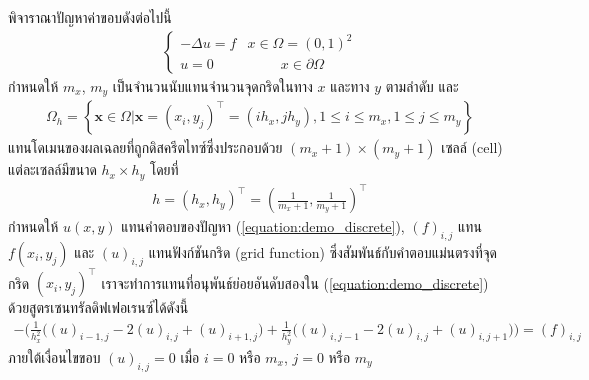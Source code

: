 \begin{Example}
    พิจาราณาปัญหาค่าขอบดังต่อไปนี้
    \begin{align}
        \left \{ \begin{array}{ll}   -\Delta u = f & x \in \Omega =	(0,1)^2	 \\
        u = 0 & \hspace{1cm} x \in \partial \Omega \end{array} \right . 
        \label{equation:demo_discrete}
    \end{align}
    \hspace{1cm} กำหนดให้ $m_x$, $m_y$ เป็นจำนวนนับแทนจำนวนจุดกริดในทาง $x$ และทาง $y$ ตามลำดับ และ
    \begin{align*}
        \Omega_{h}=\left\{ \mathbf{x} \in \Omega | \mathbf{x}=(x_i,y_j)^{\top} = (ih_x,jh_y), 1 \leq i \leq m_x, 1 \leq j \leq m_y  \right\}
    \end{align*}
    แทนโดเมนของผลเฉลยที่ถูกดิสครีตไทซ์ซึ่งประกอบด้วย $(m_x+1) \times (m_y+1)$ เซลล์ (cell) แต่ละเซลล์มีขนาด $h_x \times h_y$ โดยที่
    \begin{align*}
        h = (h_x,h_y)^{\top} = (\frac{1}{m_x+1},\frac{1}{m_y+1})^{\top}
    \end{align*}
    กำหนดให้ $u(x,y)$ แทนคำตอบของปัญหา (\ref{equation:demo_discrete}), $(f)_{i,j}$ แทน $f(x_i,y_j)$ และ $(u)_{i,j}$ แทนฟังก์ชันกริด (grid function) ซึ่งสัมพันธ์กับคำตอบแม่นตรงที่จุดกริด $(x_i,y_j)^{\top}$ เราจะทำการแทนที่อนุพันธ์ย่อยอันดับสองใน  (\ref{equation:demo_discrete}) ด้วยสูตรเซนทรัลดิฟเฟอเรนซ์ได้ดังนี้
    \begin{align}
        - \Big( \frac{1}{h_x^2} \big( (u)_{i-1,j} - 2(u)_{i,j} + (u)_{i+1,j}\big) + \frac{1}{h_y^2} \big( (u)_{i,j-1} - 2(u)_{i,j} + (u)_{i,j+1}\big) \Big) = (f)_{i,j}
    \end{align}
    ภายใต้เงื่อนไขขอบ $(u)_{i,j} = 0$ เมื่อ $i = 0$ หรือ $m_x$, $j = 0$ หรือ $m_y$ 
\end{Example}